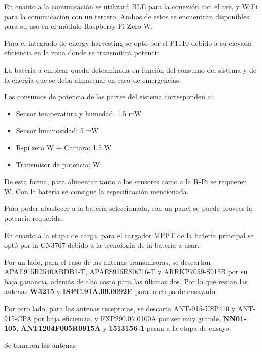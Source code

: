 En cuanto a la comunicación se utilizará BLE para la conexión con el ave, y WiFi para la comunicación con un tercero.
Ambos de estos se encuentran disponibles para su uso en el módulo Raspberry Pi Zero W.



Para el integrado de energy harvesting se optó por el P1110 debido a su elevada eficiencia en la zona donde se transmitirá potencia.


La batería a emplear queda determinada en función del consumo del sistema y de la energía que se deba almacenar en caso de emergencias. 

Los consumos de potencia de las partes del sistema corresponden a:
\begin{itemize}
	\item Sensor temperatura y humedad: 1.5 mW
	\item Sensor luminosidad: 5 mW
	\item R-pi zero W + Camara: 1.5 W
	\item Transmisor de potencia: \TBD W
\end{itemize}

De esta forma, para alimentar tanto a los sensores como a la R-Pi se requieren \TBD W. Con la batería \TBD se consigue la especificación mencionada.


Para poder abastecer a la batería seleccionada, con un panel \TBD se puede proveer la potencia requerida.



En cuanto a la etapa de carga, para el cargador MPPT de la batería principal se optó por la CN3767 debido a la tecnología de la batería a usar.

Por un lado, para el caso de las antenas transmisoras, se descartan APAE915R2540ABDB1-T, APAES915R80C16-T y ARRKP7059-S915B por su baja ganancia, además de alto costo para las últimas dos. Por lo que restan las antenas \textbf{W3215} y \textbf{ISPC.91A.09.0092E} para la etapa de ensayado.

Por otro lado, para las antenas receptoras, se descarta ANT-915-USP410 y ANT-915-CPA por baja eficiencia, y FXP290.07.0100A por ser muy grande. \textbf{NN01-105}, \textbf{ANT1204F005R0915A} y \textbf{1513156-1} pasan a la etapa de ensayo.


Se tomaron las antenas  


\TBD
